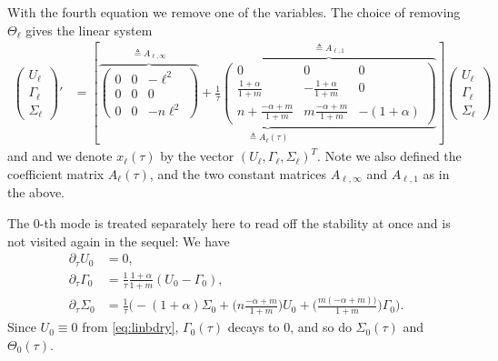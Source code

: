 \documentclass[a4paper,11pt]{article}
\def\l{{\ell}}
\theoremstyle{remark}
\begin{document}
{With the fourth equation we remove one of the variables. The choice of removing $\Theta_\ell$ gives the linear system
\begin{equation} \label{eq:l-system2}
\begin{aligned}
 \begin{pmatrix} U_\ell\\ \Gamma_\ell \\ \Sigma_\ell \end{pmatrix}'
 &= \left[\underbrace{\overbrace{\begin{pmatrix}
   0 & 0 & -\l^2\\
   0 & 0 & 0\\
   0 & 0 & -n\l^2
  \end{pmatrix} }^{\triangleq A_{\ell,\infty}}
  + \frac{1}{\tau}
  \overbrace{\begin{pmatrix}
   0 & 0 & 0\\
   \frac{1+\alpha}{1+m} & -\frac{1+\alpha}{1+m} & 0\\
   n+ \frac{-\alpha+m}{1+m} & m\frac{-\alpha+m}{1+m}& -(1+\alpha)
  \end{pmatrix} }^{\triangleq A_{\ell,1}}}_{\triangleq A_\ell(\tau)} \right] \begin{pmatrix} U_\ell\\ \Gamma_\ell \\ \Sigma_\ell \end{pmatrix}
\end{aligned}
\end{equation}
and and we denote $x_\ell(\tau)$ by the vector $(U_\ell,\Gamma_\ell, \Sigma_\ell)^T$. Note we also defined the coefficient matrix $A_\ell(\tau)$, and the two constant matrices $A_{\ell,\infty}$ and $A_{\ell,1}$ as in the above.

The $0$-th mode is treated separately here to read off the stability at once and is not visited again in the sequel: We have
\begin{align*}
   \partial_\tau U_0 &= 0,\\
  \partial_\tau\Gamma_0 &= \frac{1}{\tau}\frac{1+\alpha}{1+m}(U_0-\Gamma_0),\\
  \partial_\tau\Sigma_0 &= \frac{1}{\tau}\Big( -(1+\alpha)\Sigma_0 + \big(n\frac{-\alpha+m}{1+m}\big)U_0 + \big(\frac{m(-\alpha+m))}{1+m}\big)\Gamma_0\Big).
\end{align*}
Since $U_0\equiv0$ from \eqref{eq:linbdry}, $\Gamma_0(\tau)$ decays to $0$, and so do $\Sigma_0(\tau)$ and $\Theta_0(\tau)$.

}
\end{document}
